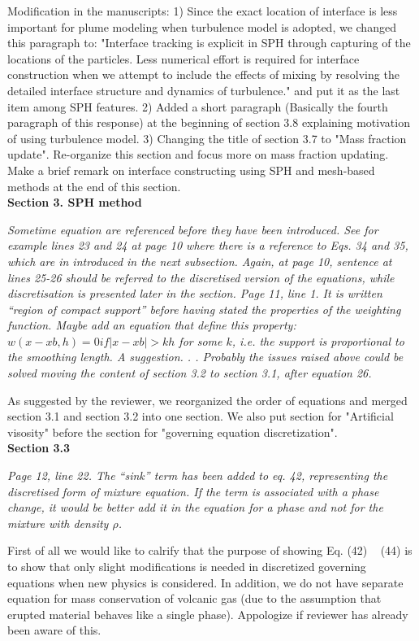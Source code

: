 \documentclass[10pt,a4paper]{article}
\begin{document}
Modification in the manuscripts:
1) Since the exact location of interface is less important for plume modeling when turbulence model is adopted, we changed this paragraph to: 
"Interface tracking is explicit in SPH through capturing of the locations of the particles. Less numerical effort is required for interface construction when we attempt to include the effects of mixing by resolving the detailed interface structure and dynamics of turbulence." and put it as the last item among SPH features.
2) Added a short paragraph (Basically the fourth paragraph of this response) at the beginning of section 3.8 explaining motivation of using turbulence model. 
3) Changing the title of section 3.7 to "Mass fraction update". Re-organize this section and focus more on mass fraction updating. Make a brief remark on interface constructing using SPH and mesh-based methods at the end of this section. \\[6pt]

\textbf{Section 3. SPH method}

\textit{Sometime equation are referenced before they have been introduced. See for example lines 23 and 24 at page 10 where there is a reference to Eqs. 34 and 35, which are in introduced in the next subsection. Again, at page 10, sentence at lines 25-26 should be referred to the discretised version of the equations, while discretisation is presented later in the section. Page 11, line 1. It is written “region of compact support” before having stated the
properties of the weighting function. Maybe add an equation that define this property: $w(x-xb,h) = 0 if |x-xb|>kh$ for some $k$, i.e. the support is proportional to the smoothing length. A suggestion. . . Probably the issues raised above could be solved moving the content of section 3.2 to section 3.1, after equation 26.} 

As suggested by the reviewer, we reorganized the order of equations and merged section 3.1 and  section 3.2 into one section. We also put section for "Artificial visosity" before the section for "governing equation discretization". \\[6pt]
 
\textbf{Section 3.3}

\textit{Page 12, line 22. The “sink” term has been added to eq. 42, representing the discretised form of mixture equation. If the term is associated with a phase change, it would be better add it in the equation for a phase and not for the mixture with density $\rho$.}

First of all we would like to calrify that the purpose of showing Eq. (42) ~ (44) is to show that only slight modifications is needed in discretized governing equations when new physics is considered. In addition, we do not have separate equation for mass conservation of volcanic gas (due to the assumption that erupted material behaves like a single phase). Appologize if reviewer has already been aware of this.
\end{document}
